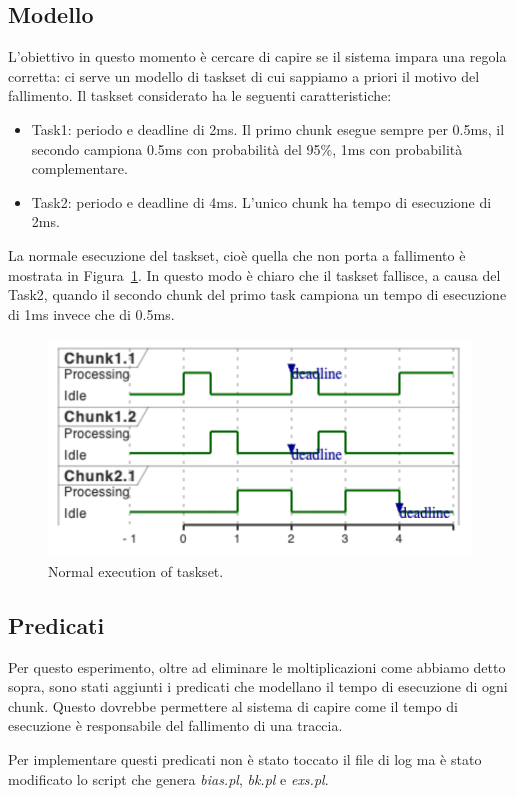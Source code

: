 \subsection{Modello}
L'obiettivo in questo momento è cercare di capire se il sistema impara una regola corretta: ci serve un modello di taskset di cui sappiamo a priori il motivo del fallimento. Il taskset considerato ha le seguenti caratteristiche:
\begin{itemize}
    \item Task1: periodo e deadline di 2ms. Il primo chunk esegue sempre per 0.5ms, il secondo campiona 0.5ms con probabilità del 95\%, 1ms con probabilità complementare.
    \item Task2: periodo e deadline di 4ms. L'unico chunk ha tempo di esecuzione di 2ms.
\end{itemize}
La normale esecuzione del taskset, cioè quella che non porta a fallimento è mostrata in Figura~\ref{fig:tasksetmodel}. In questo modo è chiaro che il taskset fallisce, a causa del Task2, quando il secondo chunk del primo task campiona un tempo di esecuzione di 1ms invece che di 0.5ms.
\begin{figure}[htbp]
    \centering
    \includegraphics[width=.75\textwidth]{images/3-esperimenti/tasksetmodel.pdf}
    \caption{Normal execution of taskset.}
    \label{fig:tasksetmodel}
\end{figure}

\subsection{Predicati}
Per questo esperimento, oltre ad eliminare le moltiplicazioni come abbiamo detto sopra, sono stati aggiunti i predicati che modellano il tempo di esecuzione di ogni chunk. Questo dovrebbe permettere al sistema di capire come il tempo di esecuzione è responsabile del fallimento di una traccia.

Per implementare questi predicati non è stato toccato il file di log ma è stato modificato lo script che genera \textit{bias.pl}, \textit{bk.pl} e \textit{exs.pl}.

